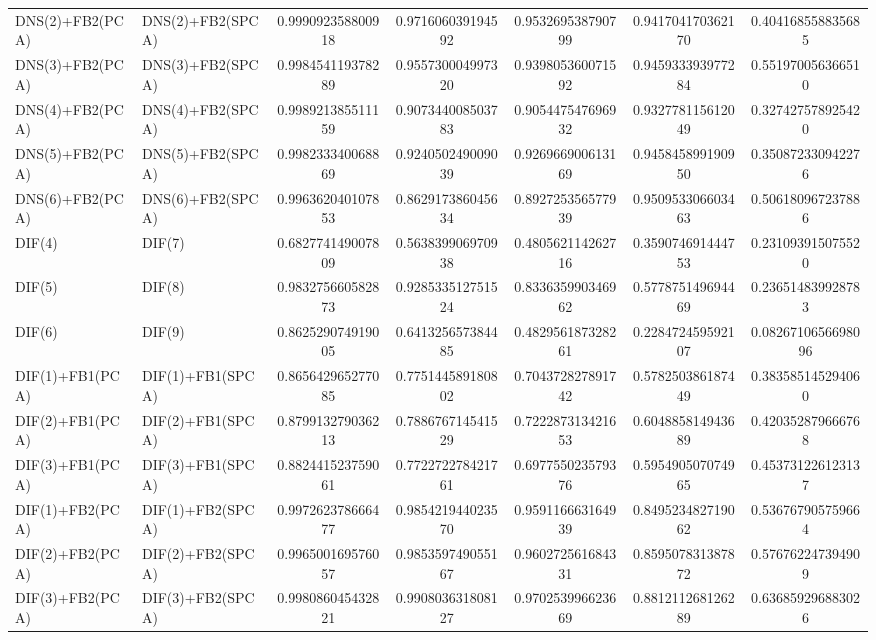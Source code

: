 \begin{table}[H]
\begin{tabular}{llSSSSS}
DNS(2)+FB2(PCA) & DNS(2)+FB2(SPCA) & 0.999092358800918 & 0.971606039194592 & 0.953269538790799 & 0.941704170362170 & 0.404168558835685 \\ 
DNS(3)+FB2(PCA) & DNS(3)+FB2(SPCA) & 0.998454119378289 & 0.955730004997320 & 0.939805360071592 & 0.945933393977284 & 0.551970056366510 \\ 
DNS(4)+FB2(PCA) & DNS(4)+FB2(SPCA) & 0.998921385511159 & 0.907344008503783 & 0.905447547696932 & 0.932778115612049 & 0.327427578925420 \\ 
DNS(5)+FB2(PCA) & DNS(5)+FB2(SPCA) & 0.998233340068869 & 0.924050249009039 & 0.926966900613169 & 0.945845899190950 & 0.350872330942276 \\ 
DNS(6)+FB2(PCA) & DNS(6)+FB2(SPCA) & 0.996362040107853 & 0.862917386045634 & 0.892725356577939 & 0.950953306603463 & 0.506180967237886 \\ 
DIF(4) & DIF(7) & 0.682774149007809 & 0.563839906970938 & 0.480562114262716 & 0.359074691444753 & 0.231093915075520 \\ 
DIF(5) & DIF(8) & 0.983275660582873 & 0.928533512751524 & 0.833635990346962 & 0.577875149694469 & 0.236514839928783 \\ 
DIF(6) & DIF(9) & 0.862529074919005 & 0.641325657384485 & 0.482956187328261 & 0.228472459592107 & 0.0826710656698096 \\ 
DIF(1)+FB1(PCA) & DIF(1)+FB1(SPCA) & 0.865642965277085 & 0.775144589180802 & 0.704372827891742 & 0.578250386187449 & 0.383585145294060 \\ 
DIF(2)+FB1(PCA) & DIF(2)+FB1(SPCA) & 0.879913279036213 & 0.788676714541529 & 0.722287313421653 & 0.604885814943689 & 0.420352879666768 \\ 
DIF(3)+FB1(PCA) & DIF(3)+FB1(SPCA) & 0.882441523759061 & 0.772272278421761 & 0.697755023579376 & 0.595490507074965 & 0.453731226123137 \\ 
DIF(1)+FB2(PCA) & DIF(1)+FB2(SPCA) & 0.997262378666477 & 0.985421944023570 & 0.959116663164939 & 0.849523482719062 & 0.536767905759664 \\ 
DIF(2)+FB2(PCA) & DIF(2)+FB2(SPCA) & 0.996500169576057 & 0.985359749055167 & 0.960272561684331 & 0.859507831387872 & 0.576762247394909 \\ 
DIF(3)+FB2(PCA) & DIF(3)+FB2(SPCA) & 0.998086045432821 & 0.990803631808127 & 0.970253996623669 & 0.881211268126289 & 0.636859296883026 \\ \bottomrule 
\end{tabular}
\end{table}


